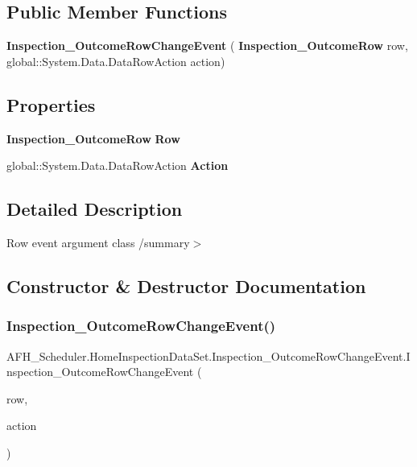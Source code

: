 \subsection*{Public Member Functions}
\begin{DoxyCompactItemize}
\item 
\textbf{ Inspection\+\_\+\+Outcome\+Row\+Change\+Event} (\textbf{ Inspection\+\_\+\+Outcome\+Row} row, global\+::\+System.\+Data.\+Data\+Row\+Action action)
\end{DoxyCompactItemize}
\subsection*{Properties}
\begin{DoxyCompactItemize}
\item 
\textbf{ Inspection\+\_\+\+Outcome\+Row} \textbf{ Row}\hspace{0.3cm}{\ttfamily  [get]}
\item 
global\+::\+System.\+Data.\+Data\+Row\+Action \textbf{ Action}\hspace{0.3cm}{\ttfamily  [get]}
\end{DoxyCompactItemize}


\subsection{Detailed Description}
Row event argument class /summary$>$ 

\subsection{Constructor \& Destructor Documentation}
\mbox{\label{class_a_f_h___scheduler_1_1_home_inspection_data_set_1_1_inspection___outcome_row_change_event_a80b2a46fd141908bc081cd221c140392}} 
\subsubsection{Inspection\_OutcomeRowChangeEvent()}
{\footnotesize\ttfamily A\+F\+H\+\_\+\+Scheduler.\+Home\+Inspection\+Data\+Set.\+Inspection\+\_\+\+Outcome\+Row\+Change\+Event.\+Inspection\+\_\+\+Outcome\+Row\+Change\+Event (\begin{DoxyParamCaption}\item[{\textbf{ Inspection\+\_\+\+Outcome\+Row}}]{row,  }\item[{global\+::\+System.\+Data.\+Data\+Row\+Action}]{action }\end{DoxyParamCaption})}



